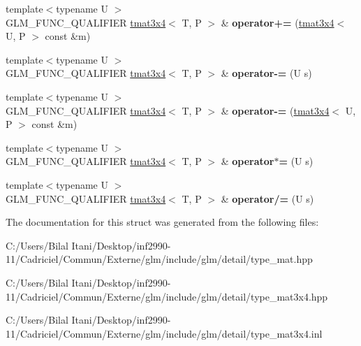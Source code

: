 \begin{DoxyCompactItemize}
\item 
{\footnotesize template$<$typename U $>$ }\\G\+L\+M\+\_\+\+F\+U\+N\+C\+\_\+\+Q\+U\+A\+L\+I\+F\+I\+ER \hyperlink{structglm_1_1detail_1_1tmat3x4}{tmat3x4}$<$ T, P $>$ \& {\bfseries operator+=} (\hyperlink{structglm_1_1detail_1_1tmat3x4}{tmat3x4}$<$ U, P $>$ const \&m)\hypertarget{structglm_1_1detail_1_1tmat3x4_a9c28e24ea115b67e1901be600e1acac3}{}\label{structglm_1_1detail_1_1tmat3x4_a9c28e24ea115b67e1901be600e1acac3}

\item 
{\footnotesize template$<$typename U $>$ }\\G\+L\+M\+\_\+\+F\+U\+N\+C\+\_\+\+Q\+U\+A\+L\+I\+F\+I\+ER \hyperlink{structglm_1_1detail_1_1tmat3x4}{tmat3x4}$<$ T, P $>$ \& {\bfseries operator-\/=} (U s)\hypertarget{structglm_1_1detail_1_1tmat3x4_a8803004a4da174ad2953f76aa6fb3aa5}{}\label{structglm_1_1detail_1_1tmat3x4_a8803004a4da174ad2953f76aa6fb3aa5}

\item 
{\footnotesize template$<$typename U $>$ }\\G\+L\+M\+\_\+\+F\+U\+N\+C\+\_\+\+Q\+U\+A\+L\+I\+F\+I\+ER \hyperlink{structglm_1_1detail_1_1tmat3x4}{tmat3x4}$<$ T, P $>$ \& {\bfseries operator-\/=} (\hyperlink{structglm_1_1detail_1_1tmat3x4}{tmat3x4}$<$ U, P $>$ const \&m)\hypertarget{structglm_1_1detail_1_1tmat3x4_ab293ffba697e138783137b5a0961afdf}{}\label{structglm_1_1detail_1_1tmat3x4_ab293ffba697e138783137b5a0961afdf}

\item 
{\footnotesize template$<$typename U $>$ }\\G\+L\+M\+\_\+\+F\+U\+N\+C\+\_\+\+Q\+U\+A\+L\+I\+F\+I\+ER \hyperlink{structglm_1_1detail_1_1tmat3x4}{tmat3x4}$<$ T, P $>$ \& {\bfseries operator$\ast$=} (U s)\hypertarget{structglm_1_1detail_1_1tmat3x4_a329a90caa5d646b47ad7af4fdd657e95}{}\label{structglm_1_1detail_1_1tmat3x4_a329a90caa5d646b47ad7af4fdd657e95}

\item 
{\footnotesize template$<$typename U $>$ }\\G\+L\+M\+\_\+\+F\+U\+N\+C\+\_\+\+Q\+U\+A\+L\+I\+F\+I\+ER \hyperlink{structglm_1_1detail_1_1tmat3x4}{tmat3x4}$<$ T, P $>$ \& {\bfseries operator/=} (U s)\hypertarget{structglm_1_1detail_1_1tmat3x4_aa6519a6c5e446e309ad26f609fdb9a74}{}\label{structglm_1_1detail_1_1tmat3x4_aa6519a6c5e446e309ad26f609fdb9a74}

\end{DoxyCompactItemize}


The documentation for this struct was generated from the following files\+:\begin{DoxyCompactItemize}
\item 
C\+:/\+Users/\+Bilal Itani/\+Desktop/inf2990-\/11/\+Cadriciel/\+Commun/\+Externe/glm/include/glm/detail/type\+\_\+mat.\+hpp\item 
C\+:/\+Users/\+Bilal Itani/\+Desktop/inf2990-\/11/\+Cadriciel/\+Commun/\+Externe/glm/include/glm/detail/type\+\_\+mat3x4.\+hpp\item 
C\+:/\+Users/\+Bilal Itani/\+Desktop/inf2990-\/11/\+Cadriciel/\+Commun/\+Externe/glm/include/glm/detail/type\+\_\+mat3x4.\+inl\end{DoxyCompactItemize}
